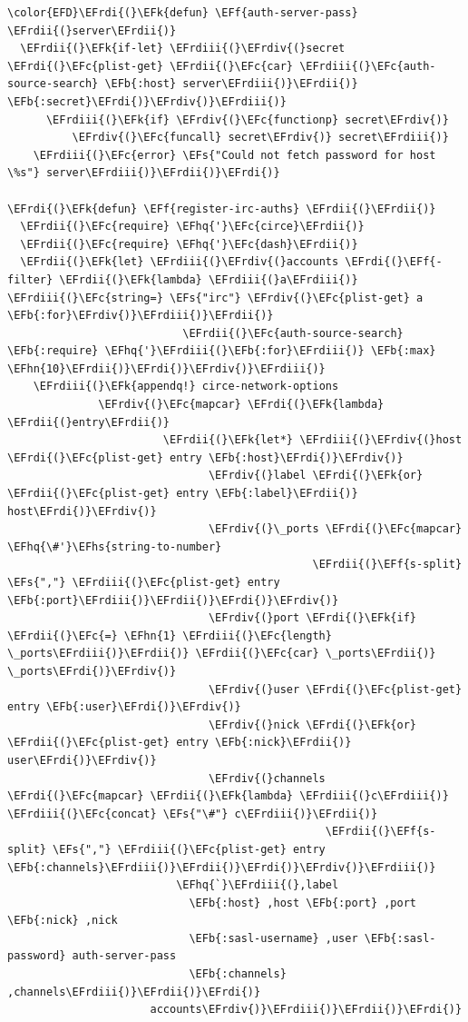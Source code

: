\documentclass{scrartcl}
\newcommand{\EFk}[1]{\textcolor{EFk}{#1}} %
\newcommand{\EFs}[1]{\textcolor{EFs}{#1}} %
\newcommand{\EFb}[1]{\textcolor{EFb}{#1}} %
\newcommand{\EFc}[1]{\textcolor{EFc}{#1}} %
\newcommand{\EFf}[1]{\textcolor{EFf}{#1}} %
\newcommand{\EFhn}[1]{\textcolor{EFhn}{\textbf{#1}}} %
\newcommand{\EFhq}[1]{\textcolor{EFhq}{#1}} %
\newcommand{\EFhs}[1]{\textcolor{EFhs}{#1}} %
\newcommand{\EFrdi}[1]{\textcolor{EFrdi}{#1}} %
\newcommand{\EFrdii}[1]{\textcolor{EFrdii}{#1}} %
\newcommand{\EFrdiii}[1]{\textcolor{EFrdiii}{#1}} %
\newcommand{\EFrdiv}[1]{\textcolor{EFrdiv}{#1}} %
\begin{document}
\begin{Code}
\begin{Verbatim}[]
\color{EFD}\EFrdi{(}\EFk{defun} \EFf{auth-server-pass} \EFrdii{(}server\EFrdii{)}
  \EFrdii{(}\EFk{if-let} \EFrdiii{(}\EFrdiv{(}secret \EFrdi{(}\EFc{plist-get} \EFrdii{(}\EFc{car} \EFrdiii{(}\EFc{auth-source-search} \EFb{:host} server\EFrdiii{)}\EFrdii{)} \EFb{:secret}\EFrdi{)}\EFrdiv{)}\EFrdiii{)}
      \EFrdiii{(}\EFk{if} \EFrdiv{(}\EFc{functionp} secret\EFrdiv{)}
          \EFrdiv{(}\EFc{funcall} secret\EFrdiv{)} secret\EFrdiii{)}
    \EFrdiii{(}\EFc{error} \EFs{"Could not fetch password for host \%s"} server\EFrdiii{)}\EFrdii{)}\EFrdi{)}

\EFrdi{(}\EFk{defun} \EFf{register-irc-auths} \EFrdii{(}\EFrdii{)}
  \EFrdii{(}\EFc{require} \EFhq{'}\EFc{circe}\EFrdii{)}
  \EFrdii{(}\EFc{require} \EFhq{'}\EFc{dash}\EFrdii{)}
  \EFrdii{(}\EFk{let} \EFrdiii{(}\EFrdiv{(}accounts \EFrdi{(}\EFf{-filter} \EFrdii{(}\EFk{lambda} \EFrdiii{(}a\EFrdiii{)} \EFrdiii{(}\EFc{string=} \EFs{"irc"} \EFrdiv{(}\EFc{plist-get} a \EFb{:for}\EFrdiv{)}\EFrdiii{)}\EFrdii{)}
                           \EFrdii{(}\EFc{auth-source-search} \EFb{:require} \EFhq{'}\EFrdiii{(}\EFb{:for}\EFrdiii{)} \EFb{:max} \EFhn{10}\EFrdii{)}\EFrdi{)}\EFrdiv{)}\EFrdiii{)}
    \EFrdiii{(}\EFk{appendq!} circe-network-options
              \EFrdiv{(}\EFc{mapcar} \EFrdi{(}\EFk{lambda} \EFrdii{(}entry\EFrdii{)}
                        \EFrdii{(}\EFk{let*} \EFrdiii{(}\EFrdiv{(}host \EFrdi{(}\EFc{plist-get} entry \EFb{:host}\EFrdi{)}\EFrdiv{)}
                               \EFrdiv{(}label \EFrdi{(}\EFk{or} \EFrdii{(}\EFc{plist-get} entry \EFb{:label}\EFrdii{)} host\EFrdi{)}\EFrdiv{)}
                               \EFrdiv{(}\_ports \EFrdi{(}\EFc{mapcar} \EFhq{\#'}\EFhs{string-to-number}
                                               \EFrdii{(}\EFf{s-split} \EFs{","} \EFrdiii{(}\EFc{plist-get} entry \EFb{:port}\EFrdiii{)}\EFrdii{)}\EFrdi{)}\EFrdiv{)}
                               \EFrdiv{(}port \EFrdi{(}\EFk{if} \EFrdii{(}\EFc{=} \EFhn{1} \EFrdiii{(}\EFc{length} \_ports\EFrdiii{)}\EFrdii{)} \EFrdii{(}\EFc{car} \_ports\EFrdii{)} \_ports\EFrdi{)}\EFrdiv{)}
                               \EFrdiv{(}user \EFrdi{(}\EFc{plist-get} entry \EFb{:user}\EFrdi{)}\EFrdiv{)}
                               \EFrdiv{(}nick \EFrdi{(}\EFk{or} \EFrdii{(}\EFc{plist-get} entry \EFb{:nick}\EFrdii{)} user\EFrdi{)}\EFrdiv{)}
                               \EFrdiv{(}channels \EFrdi{(}\EFc{mapcar} \EFrdii{(}\EFk{lambda} \EFrdiii{(}c\EFrdiii{)} \EFrdiii{(}\EFc{concat} \EFs{"\#"} c\EFrdiii{)}\EFrdii{)}
                                                 \EFrdii{(}\EFf{s-split} \EFs{","} \EFrdiii{(}\EFc{plist-get} entry \EFb{:channels}\EFrdiii{)}\EFrdii{)}\EFrdi{)}\EFrdiv{)}\EFrdiii{)}
                          \EFhq{`}\EFrdiii{(},label
                            \EFb{:host} ,host \EFb{:port} ,port \EFb{:nick} ,nick
                            \EFb{:sasl-username} ,user \EFb{:sasl-password} auth-server-pass
                            \EFb{:channels} ,channels\EFrdiii{)}\EFrdii{)}\EFrdi{)}
                      accounts\EFrdiv{)}\EFrdiii{)}\EFrdii{)}\EFrdi{)}
\end{Verbatim}
\end{Code}
\end{document}
